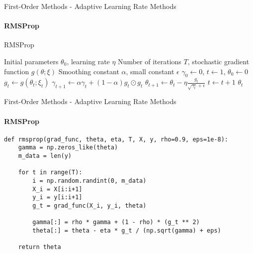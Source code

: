 \documentclass{beamer}
\begin{document}
\begin{frame}[fragile]{First-Order Methods - Adaptive Learning Rate Methods}
\framesubtitle{RMSProp}
\small
\begin{algorithm}[H]
\caption{RMSProp}
\begin{algorithmic}[1]
\Require Initial parameters $\theta_0$, learning rate $\eta$
\Require Number of iterations $T$, stochastic gradient function $g(\theta;\xi)$
\Require Smoothing constant $\alpha$, small constant $\epsilon$
\State $\gamma_0 \gets 0$, $t \gets 1$, $\theta_0 \gets0$  
    \State $g_t \gets g(\theta_t; \xi_t)$ 
    \State $\gamma_{t+1} \gets \alpha \gamma_{t} + (1-\alpha) g_t \odot g_t$ 
    \State $\theta_{t+1} \gets \theta_t - \eta \frac{g_t}{\sqrt{\gamma_t} + \epsilon}$ 
    \State $t \gets t+1$
\EndWhile
\State \Return $\theta_t$
\end{algorithmic}
\end{algorithm}
\end{frame}


\begin{frame}[fragile]{First-Order Methods - Adaptive Learning Rate Methods}
\framesubtitle{RMSProp}
\begin{verbatim}
def rmsprop(grad_func, theta, eta, T, X, y, rho=0.9, eps=1e-8):
    gamma = np.zeros_like(theta)
    m_data = len(y)

    for t in range(T):
        i = np.random.randint(0, m_data)
        X_i = X[i:i+1]
        y_i = y[i:i+1]
        g_t = grad_func(X_i, y_i, theta)

        gamma[:] = rho * gamma + (1 - rho) * (g_t ** 2)
        theta[:] = theta - eta * g_t / (np.sqrt(gamma) + eps)

    return theta

\end{verbatim}
\end{frame}
\end{document}
